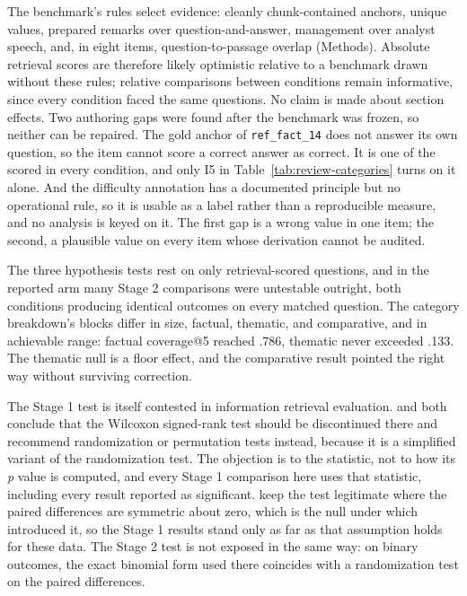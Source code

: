 The benchmark's rules select evidence: cleanly chunk-contained anchors, unique
values, prepared remarks over question-and-answer, management over analyst
speech, and, in eight items, question-to-passage overlap (Methods). Absolute retrieval scores are therefore likely
optimistic relative to a benchmark drawn without these rules; relative
comparisons between conditions remain informative, since every condition faced
the same questions. No claim is made about section effects. Two authoring gaps
were found after the benchmark was frozen, so neither can be repaired. The gold
anchor of \texttt{ref\_fact\_14} does not answer its own question, so the item
cannot score a correct answer as correct. It is one of the
\thesisNumQuestionsScored{} scored in every condition, and only I5 in
Table~\ref{tab:review-categories} turns on it alone.
And the difficulty annotation has a documented principle but no operational
rule, so it is usable as a label rather than a reproducible measure, and no analysis is keyed on it.
The first gap is a wrong value in one item; the second, a plausible value on
every item whose derivation cannot be audited.

The three hypothesis tests rest on only \thesisNumQuestionsScored{}
retrieval-scored questions, and in the reported arm many Stage 2 comparisons
were untestable outright, both conditions producing identical outcomes on every
matched question. The category breakdown's blocks differ in size,
\thesisNumQuestionsFactual{} factual,
\thesisNumQuestionsThematic{} thematic, and \thesisNumQuestionsComparative{}
comparative, and in achievable range: factual coverage@5 reached .786,
thematic never exceeded .133. The thematic null is a floor effect, and the
comparative result pointed the right way without surviving correction.

The Stage 1 test is itself contested in information retrieval evaluation.
\textcite{smucker2007} and \textcite{urbano2019} both conclude that the Wilcoxon
signed-rank test should be discontinued there and recommend randomization or
permutation tests instead, \textcite{smucker2007} because it is a simplified
variant of the randomization test. The objection is to the statistic, not to how
its \emph{p} value is computed, and every Stage 1 comparison here uses that
statistic, including every result reported as significant. \textcite{urbano2019}
keep the test legitimate where the paired differences are symmetric about zero,
which is the null under which \textcite{wilcoxon1945} introduced it, so the Stage
1 results stand only as far as that assumption holds for these data. The Stage 2
test is not exposed in the same way: on binary outcomes, the exact binomial form
used there coincides with a randomization test on the paired differences.

